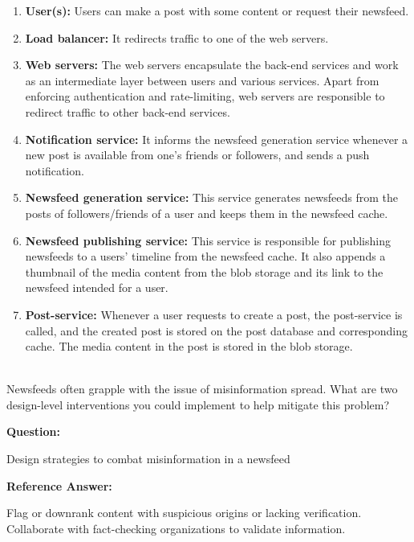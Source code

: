 \begin{enumerate}
\item
\protect{}\label{mAgi_U1auXRpDujzJuUy-}
\textbf{User(s):} Users can make a post with some content or request their newsfeed.
\item
\protect{}\label{rKis8I6Z2ABmKpGunXLRW}
\textbf{Load balancer:} It redirects traffic to one of the web servers.
\item
\protect{}\label{2J-DUi2cM5VKBGyjOCsI_}
\textbf{Web servers:} The web servers encapsulate the back-end services and work as an intermediate layer between users and various services. Apart from enforcing authentication and rate-limiting, web servers are responsible to redirect traffic to other back-end services.
\item
\protect{}\label{vrEjRA2grALalvzc9RFf2}
\textbf{Notification service:} It informs the newsfeed generation service whenever a new post is available from one's friends or followers, and sends a push notification.
\item
\protect{}\label{MIqTOeJZX9_uI_MMUkUY6}
\textbf{Newsfeed generation service:} This service generates newsfeeds from the posts of followers/friends of a user and keeps them in the newsfeed cache.
\item
\protect{}\label{UQ2t3KAi9SYv5iaKGqRVD}
\textbf{Newsfeed publishing service:} This service is responsible for publishing newsfeeds to a users' timeline from the newsfeed cache. It also appends a thumbnail of the media content from the blob storage and its link to the newsfeed intended for a user.
\item
\protect{}\label{woKY-I7V0-bdSBwfRSGAK}
\textbf{Post-service:} Whenever a user requests to create a post, the post-service is called, and the created post is stored on the post database and corresponding cache. The media content in the post is stored in the blob storage.
\end{enumerate}
\\
Newsfeeds often grapple with the issue of misinformation spread. What are two design-level interventions you could implement to help mitigate this problem?

\textbf{Question:}

Design strategies to combat misinformation in a newsfeed

\textbf{Reference Answer:}

Flag or downrank content with suspicious origins or lacking verification. Collaborate with fact-checking organizations to validate information.

